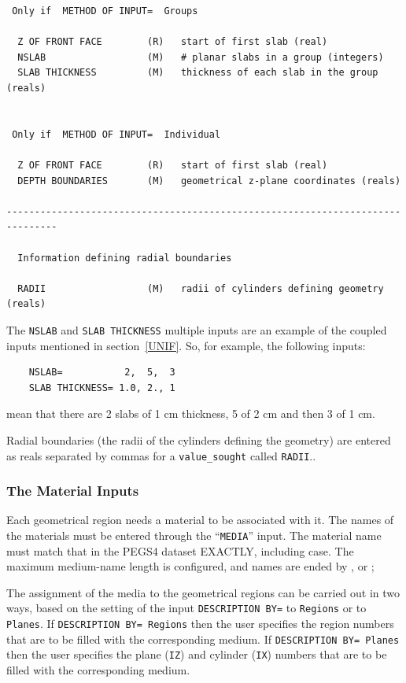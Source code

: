 \documentclass[12pt,twoside]{article}  %
\begin{document}
\begin{verbatim}
 Only if  METHOD OF INPUT=  Groups

  Z OF FRONT FACE        (R)   start of first slab (real)
  NSLAB                  (M)   # planar slabs in a group (integers)
  SLAB THICKNESS         (M)   thickness of each slab in the group (reals)


 Only if  METHOD OF INPUT=  Individual

  Z OF FRONT FACE        (R)   start of first slab (real)
  DEPTH BOUNDARIES       (M)   geometrical z-plane coordinates (reals)

-------------------------------------------------------------------------------

  Information defining radial boundaries

  RADII                  (M)   radii of cylinders defining geometry (reals)

\end{verbatim}
  
 
The {\tt NSLAB} and {\tt SLAB THICKNESS} multiple inputs are an example of
the coupled inputs mentioned in section~\ref{UNIF}.  So, for example, the
following inputs:\\
\begin{verbatim}
    NSLAB=           2,  5,  3
    SLAB THICKNESS= 1.0, 2., 1
\end{verbatim}
mean that there are 2 slabs of 1 cm thickness, 5 of 2 cm and then 3 of 1
cm.

Radial boundaries (the radii of the cylinders defining the geometry)
are entered as reals separated by commas for a {\tt value\_sought} called
{\tt RADII}..

\subsubsection{The Material Inputs}

Each geometrical region needs a material to be associated with it.
The names of the materials must be entered through the ``\verb+MEDIA+''
input. The material name must match that in the PEGS4 dataset EXACTLY,
including case. The maximum medium-name length is configured, and names
are ended by , or ;

The assignment of the media to the geometrical
regions can be carried out in two ways, based on the setting
of the input \verb+DESCRIPTION BY=+ to \verb+Regions+ or to
\verb+Planes+.  If {\tt DESCRIPTION BY= Regions} then the user
specifies the region numbers that are to
be filled with the corresponding medium.  If
{\tt DESCRIPTION BY= Planes} then the user specifies the
plane ({\tt IZ}) and cylinder ({\tt IX}) numbers that are
to be filled with the corresponding medium.
\end{document}
